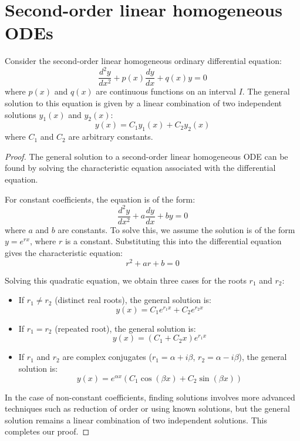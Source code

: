 \section{Second-order linear homogeneous ODEs}
\begin{theorem}
Consider the second-order linear homogeneous ordinary differential equation:
\[
\frac{d^2 y}{dx^2} + p(x)\frac{dy}{dx} + q(x)y = 0
\]
where $p(x)$ and $q(x)$ are continuous functions on an interval $I$. The general solution to this equation is given by a linear combination of two independent solutions $y_1(x)$ and $y_2(x)$:
\[
y(x) = C_1 y_1(x) + C_2 y_2(x)
\]
where $C_1$ and $C_2$ are arbitrary constants.
\end{theorem}

\begin{proof}
The general solution to a second-order linear homogeneous ODE can be found by solving the characteristic equation associated with the differential equation.

For constant coefficients, the equation is of the form:
\[
\frac{d^2 y}{dx^2} + a \frac{dy}{dx} + b y = 0
\]
where $a$ and $b$ are constants. To solve this, we assume the solution is of the form $y = e^{rx}$, where $r$ is a constant. Substituting this into the differential equation gives the characteristic equation:
\[
r^2 + a r + b = 0
\]

Solving this quadratic equation, we obtain three cases for the roots $r_1$ and $r_2$:

\begin{itemize}
    \item If $r_1 \neq r_2$ (distinct real roots), the general solution is:
    \[
    y(x) = C_1 e^{r_1 x} + C_2 e^{r_2 x}
    \]
    \item If $r_1 = r_2$ (repeated root), the general solution is:
    \[
    y(x) = (C_1 + C_2 x) e^{r_1 x}
    \]
    \item If $r_1$ and $r_2$ are complex conjugates ($r_1 = \alpha + i\beta$, $r_2 = \alpha - i\beta$), the general solution is:
    \[
    y(x) = e^{\alpha x}(C_1 \cos(\beta x) + C_2 \sin(\beta x))
    \]
\end{itemize}

In the case of non-constant coefficients, finding solutions involves more advanced techniques such as reduction of order or using known solutions, but the general solution remains a linear combination of two independent solutions. This completes our proof.
\end{proof}
